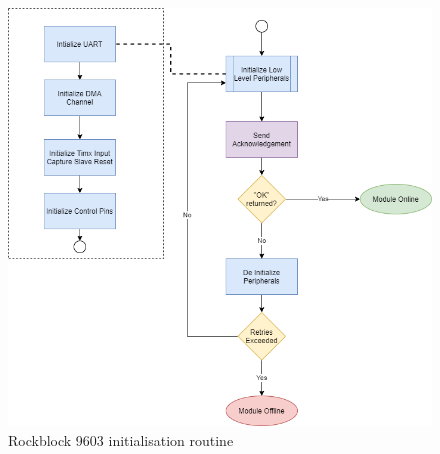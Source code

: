 \begin{figure}[H]
    \centering
    \includegraphics[scale=0.3]{Iridium Init Routine.png}
    \caption{Rockblock 9603 initialisation routine}
    \label{fig:Init_diagram_ir}
\end{figure}


